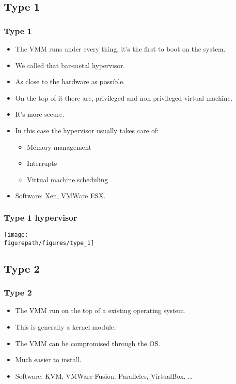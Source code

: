 \subsection{Type 1}
\begin{frame}
\frametitle{Type 1}
\begin{itemize}
\item The VMM runs under every thing, it's the first to boot on the
system.
\item We called that bar-metal hypervisor.
\item As close to the hardware as possible.
\item On the top of it there are, privileged and non privileged virtual
machine.
\item It's more secure.
\item In this case the hypervisor usually takes care of:
\begin{itemize}
\item Memory management
\item Interrupts
\item Virtual machine scheduling
\end{itemize}
\item Software: Xen, VMWare ESX.
\end{itemize}
\end{frame}

\begin{frame}
\begin{center}
\frametitle{Type 1 hypervisor}
\texttt{[image: \\figurepath/figures/type\_1]}
\end{center}
\end{frame}


\subsection{Type 2}
\begin{frame}
\frametitle{Type 2}
\begin{itemize}
\item The VMM run on the top of a existing operating system.
\item This is generally a kernel module.
\item The VMM can be compromised through the OS.
\item Much easier to install.
\item Software: KVM, VMWare Fusion, Paralleles, VirtualBox, \ldots
\end{itemize}
\end{frame}

